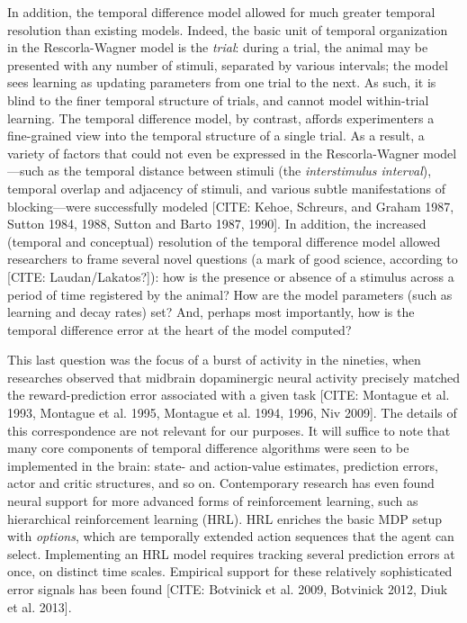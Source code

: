 In addition, the temporal difference model allowed for much greater temporal resolution than existing models.
Indeed, the basic unit of temporal organization in the Rescorla-Wagner model is the \emph{trial}: during a trial, the animal may be presented with any number of stimuli, separated by various intervals; the model sees learning as updating parameters from one trial to the next.
As such, it is blind to the finer temporal structure of trials, and cannot model within-trial learning.
The temporal difference model, by contrast, affords experimenters a fine-grained view into the temporal structure of a single trial.
As a result, a variety of factors that could not even be expressed in the Rescorla-Wagner model---such as the temporal distance between stimuli (the \emph{interstimulus interval}), temporal overlap and adjacency of stimuli, and various subtle manifestations of blocking---were successfully modeled [CITE: Kehoe, Schreurs, and Graham 1987, Sutton 1984, 1988, Sutton and Barto 1987, 1990].
In addition, the increased (temporal and conceptual) resolution of the temporal difference model allowed researchers to frame several novel questions (a mark of good science, according to [CITE: Laudan/Lakatos?]): how is the presence or absence of a stimulus across a period of time registered by the animal?
How are the model parameters (such as learning and decay rates) set?
And, perhaps most importantly, how is the temporal difference error at the heart of the model computed?

This last question was the focus of a burst of activity in the nineties, when researches observed that midbrain dopaminergic neural activity precisely matched the reward-prediction error associated with a given task [CITE: Montague et al. 1993, Montague et al. 1995, Montague et al. 1994, 1996, Niv 2009].
The details of this correspondence are not relevant for our purposes.
It will suffice to note that many core components of temporal difference algorithms were seen to be implemented in the brain: state- and action-value estimates, prediction errors, actor and critic structures, and so on.
Contemporary research has even found neural support for more advanced forms of reinforcement learning, such as hierarchical reinforcement learning (HRL).
HRL enriches the basic MDP setup with \emph{options}, which are temporally extended action sequences that the agent can select.
Implementing an HRL model requires tracking several prediction errors at once, on distinct time scales.
Empirical support for these relatively sophisticated error signals has been found [CITE: Botvinick et al. 2009, Botvinick 2012, Diuk et al. 2013].

